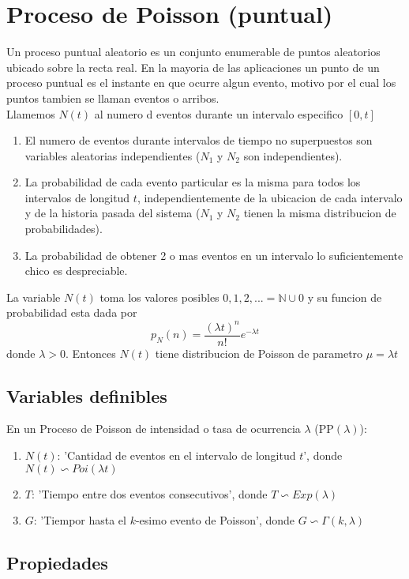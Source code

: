 \documentclass[titlepage,a4paper]{article}
\begin{document}
\section{Proceso de Poisson (puntual)}
Un proceso puntual aleatorio es un conjunto enumerable de puntos aleatorios ubicado sobre la recta real.
En la mayoria de las aplicaciones un punto de un proceso puntual es el instante en que ocurre algun 
evento, motivo por el cual los puntos tambien se llaman eventos o arribos.\\
Llamemos $N(t)$ al numero d eventos durante un intervalo especifico $[0,t]$
\begin{enumerate}
    \item El numero de eventos durante intervalos de tiempo no superpuestos son variables aleatorias independientes ($N_{1}$ y $N_{2}$ son independientes).
    \item La probabilidad de cada evento particular es la misma para todos los intervalos de longitud $t$, independientemente de la ubicacion de cada intervalo y de la historia pasada del sistema ($N_{1}$ y $N_{2}$ tienen la misma distribucion de probabilidades).
    \item La probabilidad de obtener 2 o mas eventos en un intervalo lo suficientemente chico es despreciable.
\end{enumerate}
La variable $N(t)$ toma los valores posibles ${0,1,2,...} = \mathbb{N} \cup {0}$ y su funcion de probabilidad esta dada por
\begin{equation*}
    p_{N}(n) = \frac{(\lambda t)^{n}}{n!} e^{-\lambda t}
\end{equation*}
donde $\lambda > 0$. Entonces $N(t)$ tiene distribucion de Poisson de parametro $\mu = \lambda t$
\subsection{Variables definibles}
En un Proceso de Poisson de intensidad o tasa de ocurrencia $\lambda$ (PP$(\lambda)$):
\begin{enumerate}
    \item $N(t)$: 'Cantidad de eventos en el intervalo de longitud $t$', donde $N(t) \backsim Poi(\lambda t)$
    \item $T$: 'Tiempo entre dos eventos consecutivos', donde $T \backsim Exp(\lambda)$
    \item $G$: 'Tiempor hasta el $k$-esimo evento de Poisson', donde $G \backsim \Gamma(k,\lambda)$
\end{enumerate}
\subsection{Propiedades}
\end{document}
